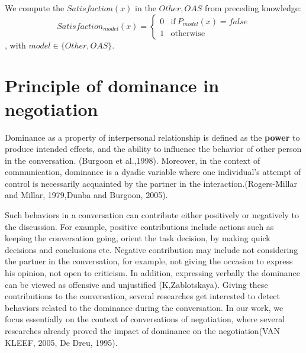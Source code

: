\documentclass{article}
\begin{document}
We compute the $Satisfaction(x)$ in the $Other, OAS$ from preceding knowledge:
	$$Satisfaction_{model}(x) = \left\{\begin{array}{ll}
		0 & \mathrm{if\ }P_{model}(x)= false\\
		1 & \mathrm{otherwise}
		\end{array}\right.$$, with $ model \in \{Other, OAS\}$.

%		
%		
%		
%		


\section{Principle of dominance in negotiation}
\par Dominance as a property of interpersonal relationship is defined as the \textbf{power} to produce intended effects, and the ability to influence the behavior of other person in the conversation. (Burgoon et al.,1998).
Moreover, in the context of communication, dominance is a dyadic variable where one individual's attempt of control is necessarily acquainted by the partner in the interaction.(Rogers-Millar and Millar, 1979,Dunba and Burgoon, 2005). 

\par Such behaviors in a conversation can contribute either positively or negatively to the discussion. For example, positive contributions include actions such as keeping the conversation going, orient the task decision, by making quick decisions and conclusions etc. Negative contribution may include not considering the partner in the conversation, for example, not giving the occasion to express his opinion, not open to criticism. In addition, expressing verbally the dominance can be viewed as offensive and unjustified (K,Zablotskaya). Giving these contributions to the conversation, several researches get interested to detect  behaviors related to the dominance during the conversation. In our work, we focus essentially on the context of conversations of negotiation, where several researches already proved the impact of dominance on the negotiation(VAN KLEEF, 2005, De Dreu, 1995). 
\end{document}
